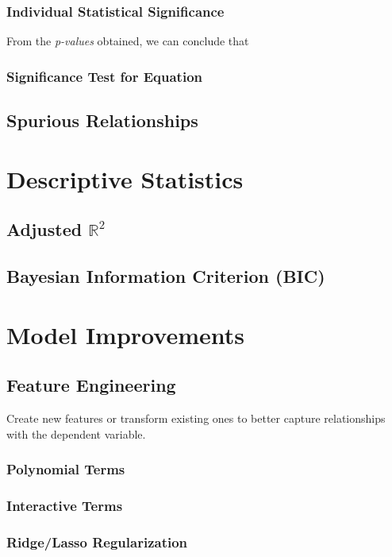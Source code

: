 \documentclass{article}
\begin{document}
\subsubsection{Individual Statistical Significance}
From the \textit{p-values} obtained, we can conclude that 

\subsubsection{Significance Test for Equation}

\subsection{Spurious Relationships}

\section{Descriptive Statistics}

\subsection{Adjusted $\mathbb{R}^2$}

\subsection{Bayesian Information Criterion (BIC)}

\section{Model Improvements}

\subsection{Feature Engineering}
Create new features or transform existing ones to better capture relationships with the dependent variable.
\subsubsection{Polynomial Terms}
\subsubsection{Interactive Terms}
\subsubsection{Ridge/Lasso Regularization}
\end{document}

